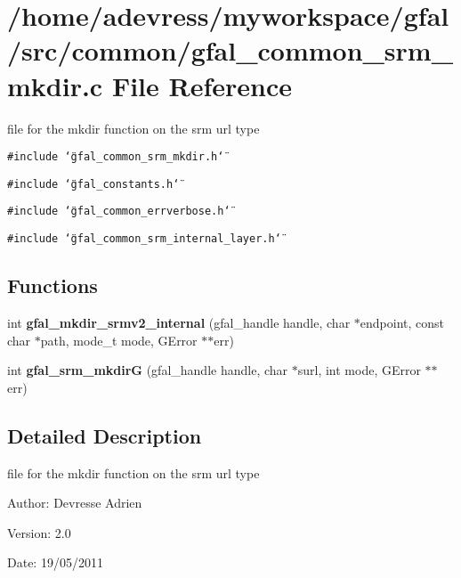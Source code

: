 \section{/home/adevress/myworkspace/gfal/src/common/gfal\_\-common\_\-srm\_\-mkdir.c File Reference}
\label{gfal__common__srm__mkdir_8c}
file for the mkdir function on the srm url type 

{\tt \#include \char`\"{}gfal\_\-common\_\-srm\_\-mkdir.h\char`\"{}}\par
{\tt \#include \char`\"{}gfal\_\-constants.h\char`\"{}}\par
{\tt \#include \char`\"{}gfal\_\-common\_\-errverbose.h\char`\"{}}\par
{\tt \#include \char`\"{}gfal\_\-common\_\-srm\_\-internal\_\-layer.h\char`\"{}}\par
\subsection*{Functions}
\begin{CompactItemize}
\item 
int \textbf{gfal\_\-mkdir\_\-srmv2\_\-internal} (gfal\_\-handle handle, char $\ast$endpoint, const char $\ast$path, mode\_\-t mode, GError $\ast$$\ast$err)\label{gfal__common__srm__mkdir_8c_da43b13d5c3fe65b5dcadd8daff2bafe}

\item 
int \textbf{gfal\_\-srm\_\-mkdir\-G} (gfal\_\-handle handle, char $\ast$surl, int mode, GError $\ast$$\ast$err)\label{gfal__common__srm__mkdir_8c_b7f321a0f5aea284d6c711e0b88749e3}

\end{CompactItemize}


\subsection{Detailed Description}
file for the mkdir function on the srm url type 

\begin{Desc}
\item[Author:]Devresse Adrien \end{Desc}
\begin{Desc}
\item[Version:]2.0 \end{Desc}
\begin{Desc}
\item[Date:]19/05/2011 \end{Desc}
